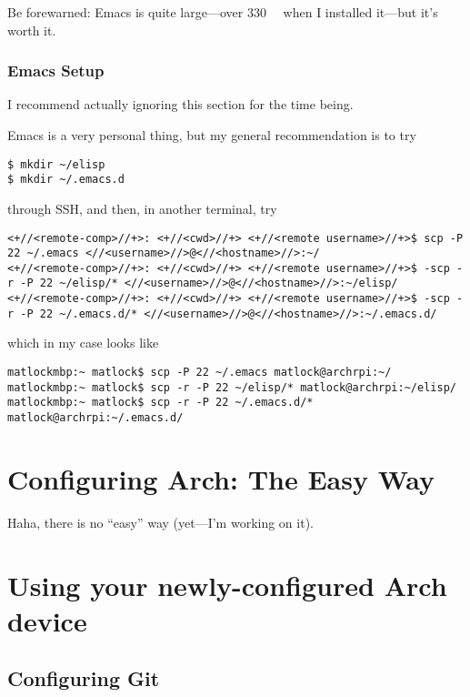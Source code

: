 \documentclass[12pt,letterpaper]{article}
\begin{document}
Be forewarned: Emacs is quite large---over \SI{330}{\mebi\byte} when I installed it---but it's worth it.

\subsubsection{Emacs Setup\label{emacs-setup}}
I recommend actually ignoring this section for the time being.

Emacs is a very personal thing, but my general recommendation is to try
\begin{lstlisting}
$ mkdir ~/elisp
$ mkdir ~/.emacs.d
\end{lstlisting}
through SSH, and then, in another terminal, try
\begin{lstlisting}[basicstyle=\ttfamily\footnotesize]
<+//<remote-comp>//+>: <+//<cwd>//+> <+//<remote username>//+>$ scp -P 22 ~/.emacs <//<username>//>@<//<hostname>//>:~/
<+//<remote-comp>//+>: <+//<cwd>//+> <+//<remote username>//+>$ -scp -r -P 22 ~/elisp/* <//<username>//>@<//<hostname>//>:~/elisp/
<+//<remote-comp>//+>: <+//<cwd>//+> <+//<remote username>//+>$ -scp -r -P 22 ~/.emacs.d/* <//<username>//>@<//<hostname>//>:~/.emacs.d/
\end{lstlisting}
which in my case looks like
\begin{lstlisting}[basicstyle=\ttfamily\footnotesize]
matlockmbp:~ matlock$ scp -P 22 ~/.emacs matlock@archrpi:~/
matlockmbp:~ matlock$ scp -r -P 22 ~/elisp/* matlock@archrpi:~/elisp/
matlockmbp:~ matlock$ scp -r -P 22 ~/.emacs.d/* matlock@archrpi:~/.emacs.d/
\end{lstlisting}

\section{Configuring Arch: The Easy Way}
Haha, there is no ``easy'' way (yet---I'm working on it).

\section{Using your newly-configured Arch device}

\subsection{Configuring Git}
\end{document}
